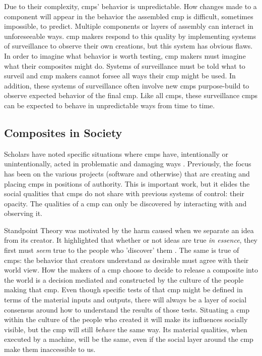 \documentclass[a4paper,man,natbib,floatsintext]{apa6}
\begin{document}
  Due to their complexity, \glspl{cmp}' behavior is unpredictable. How changes made to a component will appear in the behavior the assembled \gls{cmp} is difficult, sometimes impossible, to predict. Multiple components or layers of assembly can interact in unforeseeable ways\footnotemark. \Gls{cmp} makers respond to this quality by implementing systems of surveillance to observe their own creations, but this system has obvious flaws. In order to imagine what behavior is worth testing, \gls{cmp} makers must imagine what their composites might do. Systems of surveillance must be told what to surveil and \gls{cmp} makers cannot forsee all ways their \gls{cmp} might be used. In addition, these systems of surveillance often involve new \glspl{cmp} purpose-build to observe expected behavior of the final \gls{cmp}. Like all \glspl{cmp}, these surveillance \glspl{cmp} can be expected to behave in unpredictable ways from time to time. 


  \subsection{Composites in Society}
  Scholars have noted specific situations where \glspl{cmp} have, intentionally or unintentionally, acted in problematic and damaging ways \citep{Cheney-Lippold2018-lw,Eubanks2018-hc,Schull2012-nc}. Previously, the focus has been on the various projects (software and otherwise) that are creating and placing \glspl{cmp} in positions of authority. This is important work, but it elides the social qualities that \glspl{cmp} do not share with previous systems of control: their opacity. The qualities of a \gls{cmp} can only be discovered by interacting with and observing it. 

  Standpoint Theory was motivated by the harm caused when we separate an idea from its creator. It highlighted that whether or not ideas are true \textit{in essence}, they first must \textit{seem} true to the people who 'discover' them \citep{Harding1992-od,Haraway1988-nh}. The same is true of \glspl{cmp}: the behavior that creators understand as desirable must agree with their world view. How the makers of a \gls{cmp} choose to decide to release a composite into the world is a decision mediated and constructed by the culture of the people making that \gls{cmp}. Even though specific tests of that \gls{cmp} might be defined in terms of the material inputs and outputs, there will always be a layer of social consensus around how to understand the results of those tests. Situating a \gls{cmp} within the culture of the people who created it will make its influences socially visible, but the \gls{cmp} will still \textit{behave} the same way. Its material qualities, when executed by a machine, will be the same, even if the social layer around the \gls{cmp} make them inaccessible to us.
\end{document}
